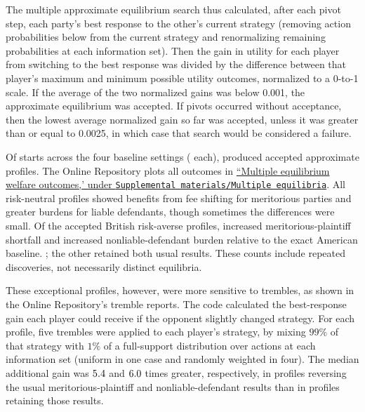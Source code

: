 \documentclass{article}
\begin{document}
The multiple approximate equilibrium search thus calculated, after each pivot step, each party's best response to the other's current strategy (removing action probabilities below \ArticleRoundingCutoff{} from the current strategy and renormalizing remaining probabilities at each information set). Then the gain in utility for each player from switching to the best response was divided by the difference between that player’s maximum and minimum possible utility outcomes, normalized to a 0-to-1 scale. If the average of the two normalized gains was below 0.001, the approximate equilibrium was accepted. If \ArticlePivotLimit{} pivots occurred without acceptance, then the lowest average normalized gain so far was accepted, unless it was greater than or equal to 0.0025, in which case that search would be considered a failure.

Of \ArticleAttemptedStarts{} starts across the four baseline settings (\ArticleStartsPerCore{} each), \ArticleAcceptedStarts{} produced accepted approximate profiles. The Online Repository plots all outcomes in \href{https://github.com/mbabramo/correlated-signals-article/blob/main/Supplemental\%20materials/Multiple\%20equilibria/Multiple\%20equilibrium\%20welfare\%20outcomes.pdf}{``Multiple equilibrium welfare outcomes,' under \texttt{Supplemental materials/Multiple equilibria}}. All risk-neutral profiles showed benefits from fee shifting for meritorious parties and greater burdens for liable defendants, though sometimes the differences were small. Of the \ArticleAcceptedBritishRa{} accepted British risk-averse profiles, \ArticlePlaintiffReversals{} increased meritorious-plaintiff shortfall and \ArticleDefendantReversals{} increased nonliable-defendant burden relative to the exact American baseline. \ArticleBothReversalsSentence{}; the other \ArticleUsualBritishRa{} retained both usual results. These counts include repeated discoveries, not necessarily distinct equilibria.

These exceptional profiles, however, were more sensitive to trembles, as shown in the Online Repository's tremble reports. The code calculated the best-response gain each player could receive if the opponent slightly changed strategy. For each profile, five trembles were applied to each player’s strategy, by mixing $99\%$ of that strategy with $1\%$ of a full-support distribution over actions at each information set (uniform in one case and randomly weighted in four). The median additional gain was $5.4$ and $6.0$ times greater, respectively, in profiles reversing the usual meritorious-plaintiff and nonliable-defendant results than in profiles retaining those results.
\end{document}
